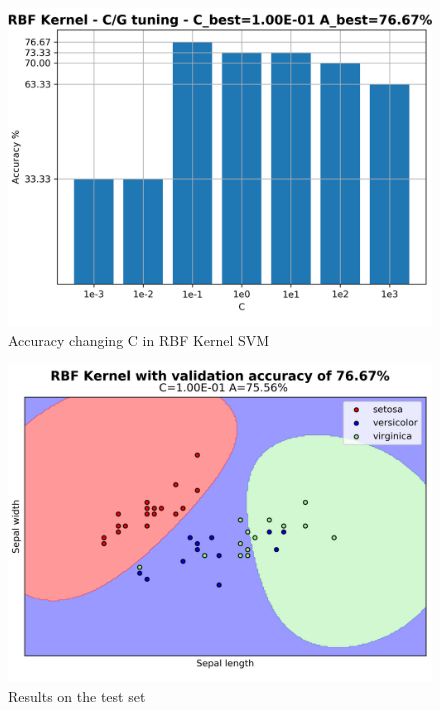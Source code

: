\documentclass[a4paper, 11pt]{article}
\begin{document}
	\begin{figure}[ht!]
		\centering
		\includegraphics[width=0.7\paperwidth]{img/fig02b.png}
		\caption{Accuracy changing C in RBF Kernel SVM }
		\label{fig:rbf2}
	\end{figure}
	\begin{figure}[ht!]
		\centering
		\includegraphics[width=0.7\paperwidth]{img/fig02c.png}
		\caption{Results on the test set}
		\label{fig:rbf3}
	\end{figure}
\end{document}
